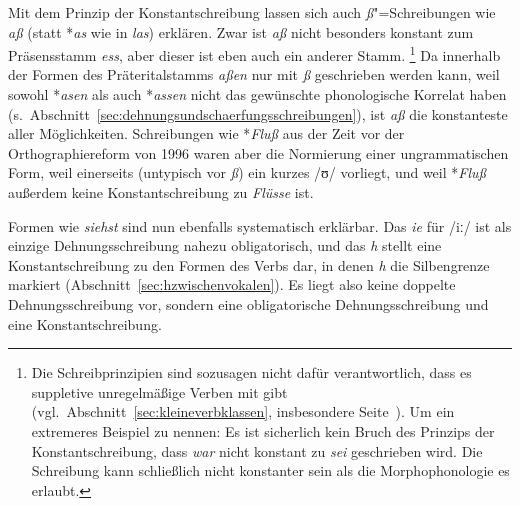 Mit dem Prinzip der Konstantschreibung lassen sich auch \textit{ß}"=Schreibungen wie \textit{aß} (statt *\textit{as} wie in \textit{las}) erklären.
Zwar ist \textit{aß} nicht besonders konstant zum Präsensstamm \textit{ess}, aber dieser ist eben auch ein anderer Stamm.%
\footnote{Die Schreibprinzipien sind sozusagen nicht dafür verantwortlich, dass es suppletive unregelmäßige Verben mit gibt (vgl.\ Abschnitt~\ref{sec:kleineverbklassen}, insbesondere Seite~\pageref{abs:kleineverbklassen123}).
Um ein extremeres Beispiel zu nennen:
Es ist sicherlich kein Bruch des Prinzips der Konstantschreibung, dass \textit{war} nicht konstant zu \textit{sei} geschrieben wird.
Die Schreibung kann schließlich nicht konstanter sein als die Morphophonologie es erlaubt.}
Da innerhalb der Formen des Präteritalstamms \textit{aßen} nur mit \textit{ß} geschrieben werden kann, weil sowohl *\textit{asen} als auch *\textit{assen} nicht das gewünschte phonologische Korrelat haben (s.\ Abschnitt~\ref{sec:dehnungsundschaerfungsschreibungen}), ist \textit{aß} die konstanteste aller Möglichkeiten.
Schreibungen wie *\textit{Fluß} aus der Zeit vor der Orthographiereform von 1996 waren aber die Normierung einer ungrammatischen Form, weil einerseits (untypisch vor \textit{ß}) ein kurzes /ʊ/ vorliegt, und weil *\textit{Fluß} außerdem keine Konstantschreibung zu \textit{Flüsse} ist.

Formen wie \textit{siehst} sind nun ebenfalls systematisch erklärbar.
Das \textit{ie} für /iː/ ist als einzige Dehnungsschreibung nahezu obligatorisch, und das \textit{h} stellt eine Konstantschreibung zu den Formen des Verbs dar, in denen \textit{h} die Silbengrenze markiert (Abschnitt~\ref{sec:hzwischenvokalen}).
Es liegt also keine doppelte Dehnungsschreibung vor, sondern eine obligatorische Dehnungsschreibung und eine Konstantschreibung.

